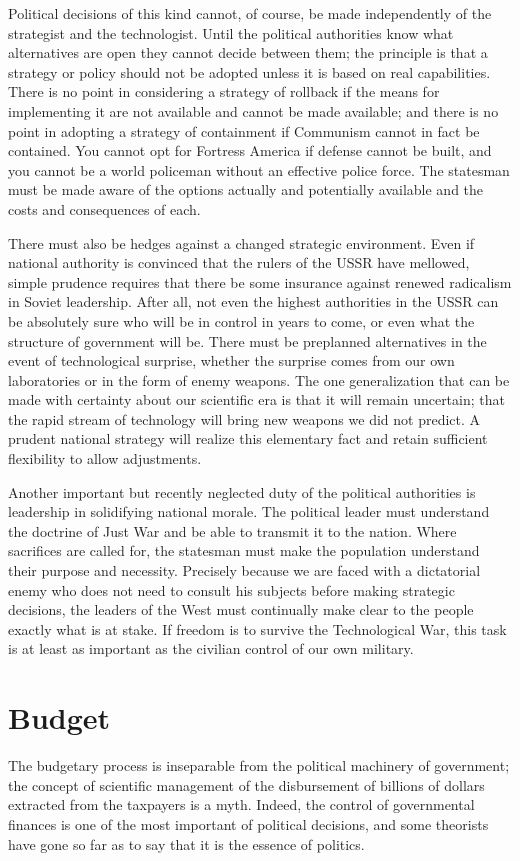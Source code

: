 Political decisions of this kind cannot, of course, be made independently of the strategist and the technologist. Until the political authorities know what alternatives are open they cannot decide between them; the principle is that a strategy or policy should not be adopted unless it is based on real capabilities. There is no point in considering a strategy of rollback if the means for implementing it are not available and cannot be made available; and there is no point in adopting a strategy of containment if Communism cannot in fact be contained. You cannot opt for Fortress America if defense cannot be built, and you cannot be a world policeman without an effective police force. The statesman must be made aware of the options actually and potentially available and the costs and consequences of each.

There must also be hedges against a changed strategic environment. Even if national authority is convinced that the rulers of the USSR have mellowed, simple prudence requires that there be some insurance against renewed radicalism in Soviet leadership. After all, not even the highest authorities in the USSR can be absolutely sure who will be in control in years to come, or even what the structure of government will be. There must be preplanned alternatives in the event of technological surprise, whether the surprise comes from our own laboratories or in the form of enemy weapons. The one generalization that can be made with certainty about our scientific era is that it will remain uncertain; that the rapid stream of technology will bring new weapons we did not predict. A prudent national strategy will realize this elementary fact and retain sufficient flexibility to allow adjustments.

Another important but recently neglected duty of the political authorities is leadership in solidifying national morale. The political leader must understand the doctrine of Just War and be able to transmit it to the nation. Where sacrifices are called for, the statesman must make the population understand their purpose and necessity. Precisely because we are faced with a dictatorial enemy who does not need to consult his subjects before making strategic decisions, the leaders of the West must continually make clear to the people exactly what is at stake. If freedom is to survive the Technological War, this task is at least as important as the civilian control of our own military.

\section{Budget}
The budgetary process is inseparable from the political machinery of government; the concept of scientific management of the disbursement of billions of dollars extracted from the taxpayers is a myth. Indeed, the control of governmental finances is one of the most important of political decisions, and some theorists have gone so far as to say that it is the essence of politics.

